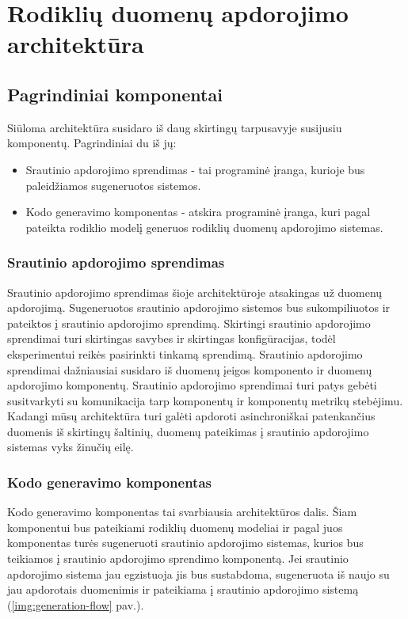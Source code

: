 \documentclass{VUMIFPSbakalaurinis}
\begin{document}
\section{Rodiklių duomenų apdorojimo architektūra}

\subsection{Pagrindiniai komponentai}
Siūloma architektūra susidaro iš daug skirtingų tarpusavyje susijusiu komponentų. Pagrindiniai du iš jų:
\begin{itemize}
    \item Srautinio apdorojimo sprendimas - tai programinė įranga, kurioje bus paleidžiamos sugeneruotos sistemos.
    \item Kodo generavimo komponentas - atskira programinė įranga, kuri pagal pateikta rodiklio modelį generuos rodiklių duomenų apdorojimo sistemas. 
\end{itemize}

\subsubsection{Srautinio apdorojimo sprendimas}

Srautinio apdorojimo sprendimas šioje architektūroje atsakingas už duomenų apdorojimą. Sugeneruotos srautinio apdorojimo sistemos bus sukompiliuotos ir pateiktos į srautinio apdorojimo sprendimą. Skirtingi srautinio apdorojimo sprendimai turi skirtingas savybes ir skirtingas konfigūracijas, todėl eksperimentui reikės pasirinkti tinkamą sprendimą. Srautinio apdorojimo sprendimai dažniausiai susidaro iš duomenų įeigos komponento ir duomenų apdorojimo komponentų. Srautinio apdorojimo sprendimai turi patys gebėti susitvarkyti su komunikacija tarp komponentų ir komponentų metrikų stebėjimu. Kadangi mūsų architektūra turi galėti apdoroti asinchroniškai patenkančius duomenis iš skirtingų šaltinių, duomenų pateikimas į srautinio apdorojimo sistemas vyks žinučių eilę. 

\subsubsection{Kodo generavimo komponentas}

Kodo generavimo komponentas tai svarbiausia architektūros dalis. Šiam komponentui bus pateikiami rodiklių duomenų modeliai ir pagal juos komponentas turės sugeneruoti srautinio apdorojimo sistemas, kurios bus teikiamos į srautinio apdorojimo sprendimo komponentą. Jei srautinio apdorojimo sistema jau egzistuoja jis bus sustabdoma, sugeneruota iš naujo su jau apdorotais duomenimis ir pateikiama į srautinio apdorojimo sistemą (\ref{img:generation-flow} pav.).
\end{document}
